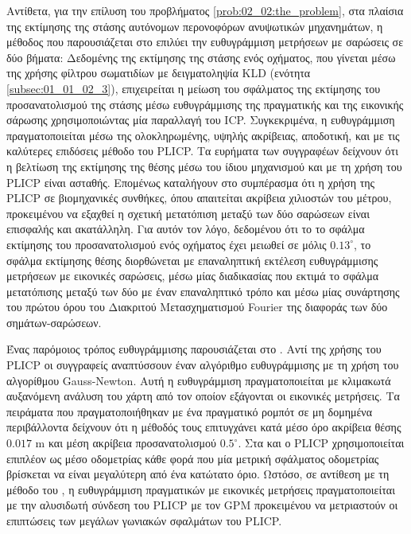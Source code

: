 Αντίθετα, για την επίλυση του προβλήματος \ref{prob:02_02:the_problem}, στα
πλαίσια της εκτίμησης της στάσης αυτόνομων περονοφόρων ανυψωτικών μηχανημάτων,
η μέθοδος που παρουσιάζεται στο \cite{Vasiljevic2016a} επιλύει την ευθυγράμμιση
μετρήσεων με σαρώσεις σε δύο βήματα: Δεδομένης της εκτίμησης της στάσης ενός
οχήματος, που γίνεται μέσω της χρήσης φίλτρου σωματιδίων με δειγματοληψία KLD
(ενότητα \ref{subsec:01_01_02_3}), επιχειρείται η μείωση του σφάλματος της
εκτίμησης του προσανατολισμού της στάσης μέσω ευθυγράμμισης της πραγματικής και
της εικονικής σάρωσης χρησιμοποιώντας μία παραλλαγή του ICP. Συγκεκριμένα, η
ευθυγράμμιση πραγματοποιείται μέσω της ολοκληρωμένης, υψηλής ακρίβειας,
αποδοτική, και με τις καλύτερες επιδόσεις μέθοδο του PLICP.  Τα ευρήματα των
συγγραφέων δείχνουν ότι η βελτίωση της εκτίμησης της θέσης μέσω του ίδιου
μηχανισμού και με τη χρήση του PLICP είναι ασταθής. Επομένως καταλήγουν στο
συμπέρασμα ότι η χρήση της PLICP σε βιομηχανικές συνθήκες, όπου απαιτείται
ακρίβεια χιλιοστών του μέτρου, προκειμένου να εξαχθεί η σχετική μετατόπιση
μεταξύ των δύο σαρώσεων είναι επισφαλής και ακατάλληλη. Για αυτόν τον λόγο,
δεδομένου ότι το το σφάλμα εκτίμησης του προσανατολισμού ενός οχήματος έχει
μειωθεί σε μόλις $0.13^\circ$, το σφάλμα εκτίμησης θέσης διορθώνεται με
επαναληπτική εκτέλεση ευθυγράμμισης μετρήσεων με εικονικές σαρώσεις, μέσω μίας
διαδικασίας που εκτιμά το σφάλμα μετατόπισης μεταξύ των δύο με έναν
επαναληπτικό τρόπο και μέσω μίας συνάρτησης του πρώτου όρου του Διακριτού
Μετασχηματισμού Fourier της διαφοράς των δύο σημάτων-σαρώσεων.

Ένας παρόμοιος τρόπος ευθυγράμμισης παρουσιάζεται στο \cite{Peng2018a}. Αντί
της χρήσης του PLICP οι συγγραφείς αναπτύσσουν έναν αλγόριθμο ευθυγράμμισης με
τη χρήση του αλγορίθμου Gauss-Newton.  Αυτή η ευθυγράμμιση πραγματοποιείται με
κλιμακωτά αυξανόμενη ανάλυση του χάρτη από τον οποίον εξάγονται οι εικονικές
μετρήσεις.  Τα πειράματα που πραγματοποιήθηκαν με ένα πραγματικό ρομπότ σε μη
δομημένα περιβάλλοντα δείχνουν ότι η μέθοδός τους επιτυγχάνει κατά μέσο όρο
ακρίβεια θέσης $0.017$ m και μέση ακρίβεια προσανατολισμού $0.5^\circ$. Στα
\cite{Chen2019a} και \cite{Liu2019a} ο PLICP χρησιμοποιείται επιπλέον ως μέσο
οδομετρίας κάθε φορά που μία μετρική σφάλματος οδομετρίας βρίσκεται να είναι
μεγαλύτερη από ένα κατώτατο όριο. Ωστόσο, σε αντίθεση με τη μέθοδο του
\cite{Peng2018a}, η ευθυγράμμιση πραγματικών με εικονικές μετρήσεις
πραγματοποιείται με την αλυσιδωτή σύνδεση του PLICP με τον GPM \cite{Censib}
προκειμένου να μετριαστούν οι επιπτώσεις των μεγάλων γωνιακών σφαλμάτων του
PLICP.

